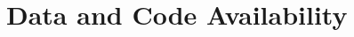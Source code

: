\documentclass[11pt]{article}
\begin{document}

















\section{Data and Code Availability}

\end{document}
